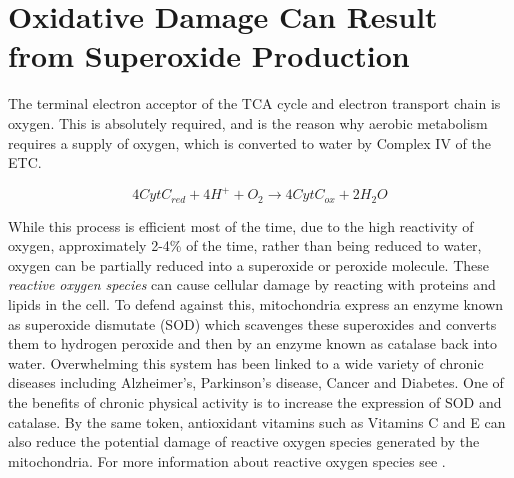 \documentclass{tufte-handout}
\begin{document}
\section{Oxidative Damage Can Result from Superoxide Production}

The terminal electron acceptor of the TCA cycle and electron transport chain is oxygen.  This is absolutely required, and is the reason why aerobic metabolism requires a supply of oxygen, which is converted to water by Complex IV of the ETC.  

\begin{equation}\label{eq:civ}
4 CytC_{red} + 4H^+ + O_2 \rightarrow 4 CytC_{ox} + 2 H_2O 
\end{equation}

While this process is efficient most of the time, due to the high reactivity of oxygen, approximately 2-4\% of the time, rather than being reduced to water, oxygen can be partially reduced into a superoxide or peroxide molecule.  These \emph{reactive oxygen species} can cause cellular damage by reacting with proteins and lipids in the cell.  To defend against this, mitochondria express an enzyme known as superoxide dismutate (SOD) which scavenges these superoxides and converts them to hydrogen peroxide and then by an enzyme known as catalase back into water.  Overwhelming this system has been linked to a wide variety of chronic diseases including Alzheimer's, Parkinson's disease, Cancer and Diabetes.  One of the benefits of chronic physical activity is to increase the expression of SOD and catalase.  By the same token, antioxidant vitamins such as Vitamins C and E can also reduce the potential damage of reactive oxygen species generated by the mitochondria.  For more information about reactive oxygen species see \citet{Turrens2003}.




\end{document}
